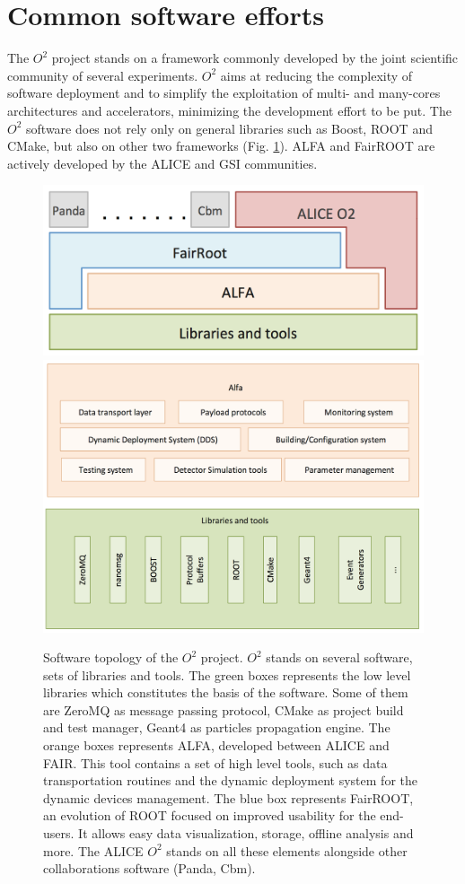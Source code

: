 \section{Common software efforts}
The $O^2$ project stands on a framework commonly developed by the joint scientific community of several experiments.
$O^2$ aims at reducing the complexity of software deployment and to simplify the exploitation of multi- and many-cores architectures and accelerators, minimizing the development effort to be put.
The $O^2$ software does not rely only on general libraries such as Boost, ROOT and CMake, but also on other two frameworks (Fig. \ref{fig:O2_soft_tree}).
ALFA and FairROOT are actively developed by the ALICE and GSI communities.

\begin{figure}[]
\begin{center}
\includegraphics[width=0.8\linewidth]{Chapters/O2/Figs/O2_soft_tree.png}
\includegraphics[width=0.8\linewidth]{Chapters/O2/Figs/ALFA.png}
\caption{Software topology of the $O^2$ project. $O^2$ stands on several software, sets of libraries and tools. The green boxes represents the low level libraries which constitutes the basis of the software. Some of them are ZeroMQ as message passing protocol, CMake as project build and test manager, Geant4 as particles propagation engine. The orange boxes represents ALFA, developed between ALICE and FAIR. This tool contains a set of high level tools, such as data transportation routines and the dynamic deployment system for the dynamic devices management. The blue box represents FairROOT, an evolution of ROOT focused on improved usability for the end-users. It allows easy data visualization, storage, offline analysis and more. The ALICE $O^2$ stands on all these elements alongside other collaborations software (Panda, Cbm).}
\label{fig:O2_soft_tree}
\end{center}
\end{figure}


